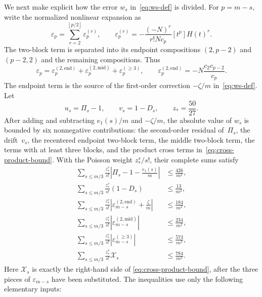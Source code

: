 \documentclass[11pt]{article}
\theoremstyle{definition}
\theoremstyle{remark}
\newcommand{\floor}[1]{\left\lfloor #1\right\rfloor}
\begin{document}
We next make explicit how the error $w_s$ in~\eqref{eq:ws-def} is divided.
For $p=m-s$, write the normalized nonlinear expansion as
\[
 \varepsilon_p=\sum_{r=2}^{\floor{p/2}}\varepsilon_p^{(r)},
 \qquad
 \varepsilon_p^{(r)}
   =-\frac{(-N)^r}{r!Nc_p}[t^p]H(t)^r.
\]
The two-block term is separated into its endpoint compositions
$(2,p-2)$ and $(p-2,2)$ and the remaining compositions.  Thus
\[
 \varepsilon_p
 =\varepsilon_p^{(2,\mathrm{end})}
  +\varepsilon_p^{(2,\mathrm{mid})}
  +\varepsilon_p^{(\ge3)},
 \qquad
 \varepsilon_p^{(2,\mathrm{end})}
 =-N\frac{c_2c_{p-2}}{c_p}.
\]
The endpoint term is the source of the first-order correction
$-\zeta/m$ in~\eqref{eq:ws-def}.  Let
\[
 u_s=\Pi_s-1,
 \qquad v_s=1-D_s,
 \qquad z_*=\frac{50}{27}.
\]
After adding and subtracting $e_1(s)/m$ and $-\zeta/m$, the absolute value of
$w_s$ is bounded by six nonnegative contributions: the second-order residual
of~$\Pi_s$, the drift~$v_s$, the recentered endpoint two-block term, the
middle two-block term, the terms with at least three blocks, and the product
cross terms in~\eqref{eq:cross-product-bound}.  With the Poisson weight
$z_*^s/s!$, their complete sums satisfy
\begin{align}
 \sum_{s\le m/3}\frac{z_*^s}{s!}
   \left|\Pi_s-1-\frac{e_1(s)}m\right|
   &\le\frac{426}{m^2},                                      \label{eq:audit-P1}\\
 \sum_{s\le m/3}\frac{z_*^s}{s!}(1-D_s)
   &\le\frac{13}{m^2},                                       \label{eq:audit-P2}\\
 \sum_{s\le m/3}\frac{z_*^s}{s!}
   \left|\varepsilon_{m-s}^{(2,\mathrm{end})}+\frac\zeta m\right|
   &\le\frac{184}{m^2},                                      \label{eq:audit-P3a}\\
 \sum_{s\le m/3}\frac{z_*^s}{s!}
   \left|\varepsilon_{m-s}^{(2,\mathrm{mid})}\right|
   &\le\frac{234}{m^2},                                      \label{eq:audit-P3b}\\
 \sum_{s\le m/3}\frac{z_*^s}{s!}
   \left|\varepsilon_{m-s}^{(\ge3)}\right|
   &\le\frac{573}{m^2},                                      \label{eq:audit-P3c}\\
 \sum_{s\le m/3}\frac{z_*^s}{s!}\mathcal X_s
   &\le\frac{784}{m^2}.                                      \label{eq:audit-P4}
\end{align}
Here $\mathcal X_s$ is exactly the right-hand side of
\eqref{eq:cross-product-bound}, after the three pieces of $\varepsilon_{m-s}$
have been substituted.  The inequalities use only the following elementary
inputs:
\end{document}
